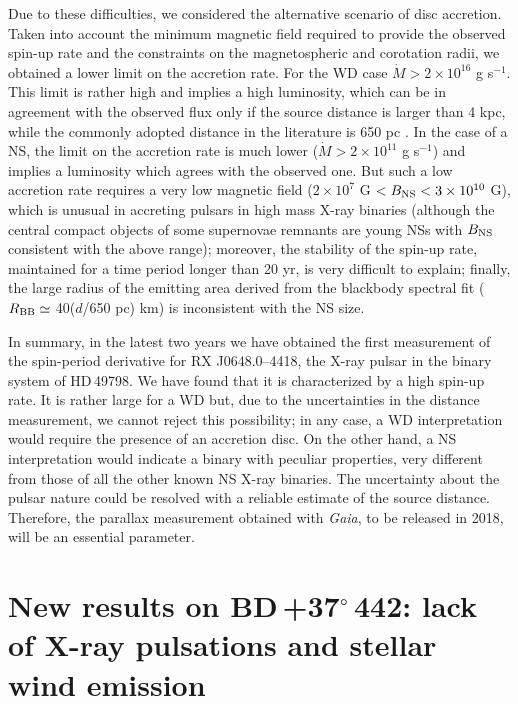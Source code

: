 \documentclass[USenglish,twocolumn]{article}
\def\BDone{BD\,+37$^\circ$\,442}
\def\RX{RX J0648.0--4418}
\def\HDone{HD\,49798}
\def\mdot {\dot M}
\begin{document}
Due to these difficulties, we considered the alternative scenario of disc accretion. Taken into account the minimum magnetic field required to provide the observed spin-up rate and the constraints on the magnetospheric and corotation radii, we obtained a lower limit on the accretion rate. For the WD case $\mdot > 2\times 10^{16}$ g s$^{-1}$. This limit is rather high and implies a high luminosity, which can be in agreement with the observed flux only if the source distance is larger than 4 kpc, while the commonly adopted distance in the literature is 650 pc \citep{KudritzkiSimon78}. In the case of a NS, the limit on the accretion rate is much lower ($\mdot > 2\times 10^{11}$ g s$^{-1}$) and implies a luminosity which agrees with the observed one. But such a low accretion rate requires a very low magnetic field ($2 \times 10^7$ G $< B_{\rm NS} < 3 \times 10^{10}$ G), which is unusual in accreting pulsars in high mass X-ray binaries (although the central compact objects of some supernovae remnants are young NSs with $B_{\rm NS}$ consistent with the above range); moreover, the stability of the spin-up rate, maintained for a time period longer than 20 yr, is very difficult to explain; finally, the large radius of the emitting area derived from the blackbody spectral fit ($R_{\rm BB} \simeq$ 40($d$/650 pc) km) is inconsistent with the NS size.

In summary, in the latest two years we have obtained the first measurement of the spin-period derivative for \RX, the X-ray pulsar in the binary system of \HDone. We have found that it is characterized by a high spin-up rate. It is rather large for a WD but, due to the uncertainties in the distance measurement, we cannot reject this possibility; in any case, a WD interpretation would require the presence of an accretion disc. On the other hand, a NS interpretation would indicate a binary with peculiar properties, very different from those of all the other known NS X-ray binaries. The uncertainty about the pulsar nature could be resolved with a reliable estimate of the source distance. Therefore, the parallax measurement obtained with \textit{Gaia}, to be released in 2018, will be an essential parameter.

\section{New results on \BDone: lack of X-ray pulsations and stellar wind emission}
\end{document}
